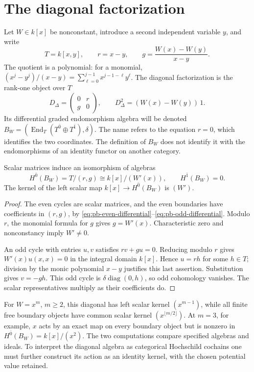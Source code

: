 \section{The diagonal factorization}
\label{sec:pb-diagonal}

Let \(W\in k[x]\) be nonconstant, introduce a second independent
variable \(y\), and write
\[
 T=k[x,y],\qquad r=x-y,\qquad
 g=\frac{W(x)-W(y)}{x-y}.
\]
The quotient is a polynomial: for a monomial,
\((x^j-y^j)/(x-y)=\sum_{\ell=0}^{j-1}x^{j-1-\ell}y^\ell\).
The diagonal factorization is the rank-one object over \(T\)
\[
 D_\Delta=\begin{pmatrix}0&r\\g&0\end{pmatrix},\qquad
 D_\Delta^2=(W(x)-W(y))\,1.
\]
Its differential graded endomorphism algebra will be denoted
\(B_W=(\operatorname{End}_T(T^{\bar0}\oplus T^{\bar1}),\delta)\).
The name refers to the equation \(r=0\), which identifies the two
coordinates. The definition of \(B_W\) does not identify it with
the endomorphisms of an identity functor on another category.

\begin{theorem}
\label{thm:pb-diagonal}
Scalar matrices induce an isomorphism of algebras
\[
 H^{\bar0}(B_W)=T/(r,g)\cong k[x]/(W'(x)),\qquad
 H^{\bar1}(B_W)=0 .
\]
The kernel of the left scalar map \(k[x]\to H^{\bar0}(B_W)\)
is \((W')\).
\end{theorem}
\begin{proof}
The even cycles are scalar matrices, and the even boundaries
have coefficients in \((r,g)\), by
\eqref{eq:pb-even-differential}--\eqref{eq:pb-odd-differential}.
Modulo \(r\), the monomial formula for \(g\) gives \(g=W'(x)\).
Characteristic zero and nonconstancy imply \(W'\ne0\).

An odd cycle with entries \(u,v\) satisfies \(rv+gu=0\).
Reducing modulo \(r\) gives \(W'(x)u(x,x)=0\) in the integral
domain \(k[x]\). Hence \(u=rh\) for some \(h\in T\);
division by the monic polynomial \(x-y\) justifies this last
assertion. Substitution gives \(v=-gh\). This odd cycle is
\(\delta\operatorname{diag}(0,h)\), so odd cohomology vanishes.
The scalar representatives multiply as their coefficients do.
\end{proof}

For \(W=x^m\), \(m\geq2\), this diagonal has left scalar kernel
\((x^{m-1})\), while all finite free boundary objects have common
scalar kernel \((x^{\lfloor m/2\rfloor})\). At \(m=3\), for example,
\(x\) acts by an exact map on every boundary object but is nonzero
in \(H^{\bar0}(B_W)=k[x]/(x^2)\). The two computations compare
specified algebras and ideals. To interpret the diagonal algebra
as categorical Hochschild cochains one must further construct its
action as an identity kernel, with the chosen potential value retained.

